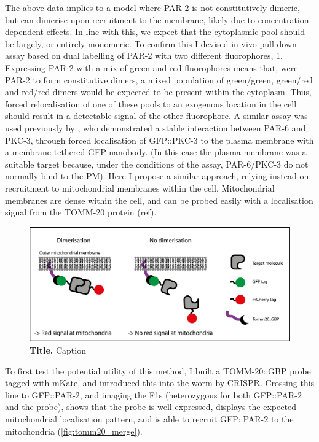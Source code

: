 \documentclass[12pt]{"article"}
\newcommand{\mycaption}[2]{\caption[#1]{\textbf{#1.} #2}}
\begin{document}
The above data implies to a model where PAR-2 is not constitutively dimeric, but can dimerise upon recruitment to the membrane, likely due to concentration-dependent effects. In line with this, we expect that the cytoplasmic pool should be largely, or entirely monomeric. To confirm this I devised in vivo pull-down assay based on dual labelling of PAR-2 with two different fluorophores, \cref{fig:tomm20_schematic}. Expressing PAR-2 with a mix of green and red fluorophores means that, were PAR-2 to form constitutive dimers, a mixed population of green/green, green/red and red/red dimers would be expected to be present within the cytoplasm. Thus, forced relocalisation of one of these pools to an exogenous location in the cell should result in a detectable signal of the other fluorophore. A similar assay was used previously by \textcite{Reich2019}, who demonstrated a stable interaction between PAR-6 and PKC-3, through forced localisation of GFP::PKC-3 to the plasma membrane with a membrane-tethered GFP nanobody. (In this case the plasma membrane was a suitable target because, under the conditions of the assay, PAR-6/PKC-3 do not normally bind to the PM). Here I propose a similar approach, relying instead on recruitment to mitochondrial membranes within the cell. Mitochondrial membranes are dense within the cell, and can be probed easily with a localisation signal from the TOMM-20 protein (ref).\\

\begin{figure}[!h]
\includegraphics[scale=0.95]{tomm20_schematic}
\setlength{\abovecaptionskip}{20pt}
\centering
\mycaption{Title}{Caption}
\label{fig:tomm20_schematic}
\end{figure}

To first test the potential utility of this method, I built a TOMM-20::GBP probe tagged with mKate, and introduced this into the worm by CRISPR. Crossing this line to GFP::PAR-2, and imaging the F1s (heterozygous for both GFP::PAR-2 and the probe), shows that the probe is well expressed, displays the expected mitochondrial localisation pattern, and is able to recruit GFP::PAR-2 to the mitochondria (\cref{fig:tomm20_merge}).\\
\end{document}

